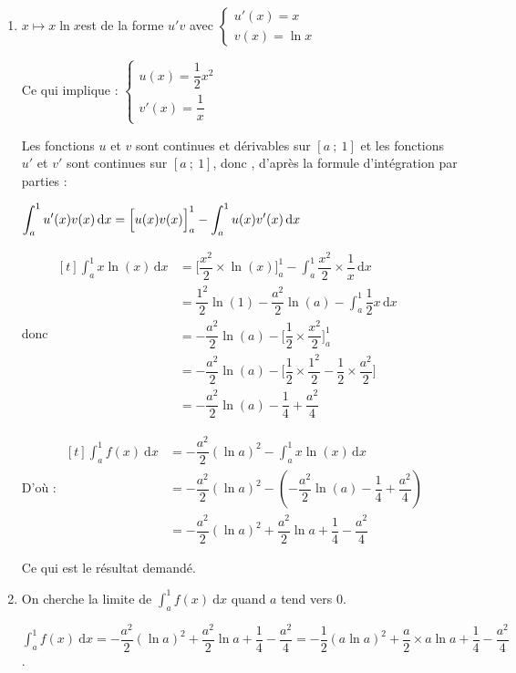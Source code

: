 \documentclass[10pt]{article}
\begin{document}
\begin{enumerate}
\begin{enumerate}
	\item  $x \longmapsto x \ln x $\quad est de la forme $u' v$ avec \quad $\begin{cases}u'(x)=x\\ v(x)=\ln x \end{cases}$

Ce qui implique : \quad $\begin{cases}u(x)=\dfrac{1}{2}x^2\\v'(x)=\dfrac{1}{x}\end{cases}$

Les fonctions $u$ et $v$ sont continues et dérivables sur $[a~;~1]$ et les fonctions $u'$ et $v'$ sont continues sur $[a~;~1]$, donc , d'après la formule d'intégration par parties :

$\displaystyle \int_{a}^{1} u'(x)v(x)\, \mathrm{d}x = \Big [ u(x)v(x)\strut\Big]_{a}^{1} - \int_{a}^{1} u(x)v'(x) \, \mathrm{d}x$\

donc 
$\begin{aligned}[t]
\displaystyle\int_a^1 x \ln (x)\, \mathrm{d}x  & =\Big[ \dfrac{x^2}{2 }\times \ln (x)\Big]_a^{1}-\int_a^{1} \dfrac{x^2}{2} \times \dfrac{1}{x} \, \mathrm{d}x \\
	& =  \dfrac{1^2}{2} \ln (1)  - \dfrac{a^2}{2} \ln (a)  - \int_a^{1} \dfrac{1}{2}x \, \mathrm{d}x \\
	&= - \dfrac{a^2}{2} \ln (a)  - \Big[ \dfrac{1}{2} \times \dfrac{x^2}{2 }\Big]_a^{1}\\
	&= - \dfrac{a^2}{2} \ln (a)  - \Big[ \dfrac{1}{2} \times \dfrac{1^2}{2 } - \dfrac{1}{2} \times \dfrac{a^2}{2 }  \Big]\\
	&= - \dfrac{a^2}{2} \ln (a)  -  \dfrac{1}{4} +  \dfrac{a^2}{4 } 
\end{aligned}$

D'où :
$\begin{aligned}[t]
\displaystyle\int_a^1 f(x)\: \text{d}x & =  - \dfrac{a^2}{2} (\ln a)^2  - \int_a^{1} x \ln(x) \, \mathrm{d}x \\
	&= - \dfrac{a^2}{2}(\ln a)^2  - \left( - \dfrac{a^2}{2} \ln (a)  -  \dfrac{1}{4} +  \dfrac{a^2}{4 }  \right) \\
	&= - \dfrac{a^2}{2}(\ln a)^2 + \dfrac{a^2}{2} \ln a + \dfrac14 - \dfrac{a^2}{4}
		\end{aligned}$

Ce qui est le résultat demandé.
\item  On cherche  la limite de $\displaystyle\int_a^1 f(x)\: \text{d}x$ quand $a$ tend vers 0.

$\displaystyle\int_a^1 f(x)\: \text{d}x = - \dfrac{a^2}{2}(\ln a)^2 + \dfrac{a^2}{2} \ln a + \dfrac14 - \dfrac{a^2}{4} = - \dfrac{1}{2} \left(a \ln a\right)^2+ \dfrac{a}{2} \times  a \ln a + \dfrac{1}{4} - \dfrac{a^2}{4}$.


\end{enumerate}
\end{enumerate}
\end{document}
